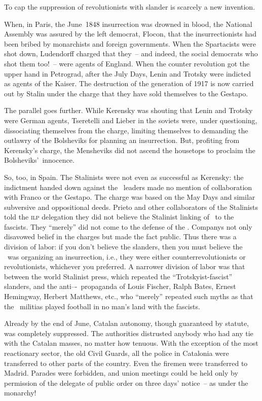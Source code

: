 To cap the suppression of revolutionists with slander is scarcely a new invention.

When, in Paris, the June~1848 insurrection was drowned in blood, the National Assembly was assured by the left democrat, Flocon, that the insurrectionists had been bribed by monarchists and foreign governments. When the Spartacists were shot down, Ludendorff charged that they~-- and indeed, the social democrats who shot them too!~-- were agents of England. When the counter revolution got the upper hand in Petrograd, after the July Days, Lenin and Trotsky were indicted as agents of the Kaiser\kn. The destruction of the generation of 1917 is now carried out by Stalin under the charge that they have sold themselves to the Gestapo.

The parallel goes further. While Kerensky was shouting that Lenin and Trotsky were German agents, Tseretelli and Lieber in the soviets were, under questioning, dissociating themselves from the charge, limiting themselves to demanding the outlawry of the Bolsheviks for planning an insurrection. But, profiting from Kerensky’s charge, the Mensheviks did not ascend the housetops to proclaim the Bolsheviks’~innocence.

So, too, in Spain. The Stalinists were not even as successful as Kerensky: the indictment handed down against the \POUM\ leaders made no mention of collaboration with Franco or the Gestapo. The charge was based on the May Days and similar subversive and oppositional deeds. Prieto and other collaborators of the Stalinists told the \textsc{ilp} delegation they did not believe the Stalinist linking of \POUM\ to the fascists. They ``merely'' did not come to the defense of the \POUM\kn. Companys not only disavowed belief in the charges but made the fact public. Thus there was a division of labor: if you don’t believe the slanders, then you must believe the \POUM\ was organizing an insurrection, i.e., they were either counterrevolutionists or revolutionists, whichever you preferred. A narrower division of labor was that between the world Stalinist press, which repeated the ``Trotskyist-fascist'' slanders, and the anti--\POUM-\CNT\ propaganda of Louis Fischer,{\indexLFischer{}} Ralph Bates, Ernest Hemingway, Herbert Matthews, etc., who ``merely'' repeated such myths as that the \POUM\ militias played football in no man’s land with the fascists.

\dinkus

Already by the end of June, Catalan autonomy, though guaranteed by statute, was completely suppressed. The authorities distrusted anybody who had any tie with the Catalan masses, no matter how tenuous. With the exception of the most reactionary sector, the old Civil Guards, all the police in Catalonia were transferred to other parts of the country. Even the firemen were transferred to Madrid. Parades were forbidden, and union meetings could be held only by permission of the delegate of public order on three days’ notice~-- as under the monarchy!
\nowidow

